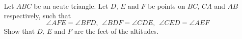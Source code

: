 Let $ABC$ be an acute triangle. Let $D$, $E$ and $F$ be points on $BC$, $CA$ and $AB$ respectively, such that
$$\angle AFE=\angle BFD,\ \ \angle BDF=\angle CDE,\ \ \angle CED=\angle AEF$$
Show that $D$, $E$ and $F$ are the feet of the altitudes.